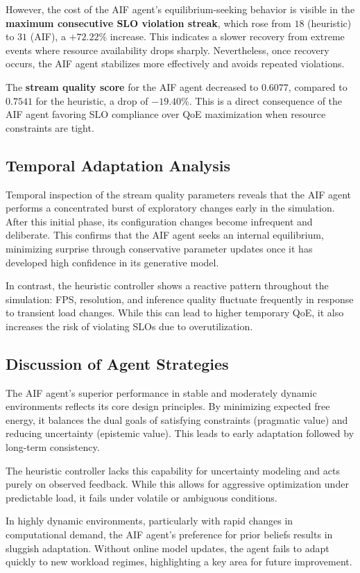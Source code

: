 However, the cost of the AIF agent’s equilibrium-seeking behavior is visible in the \textbf{maximum consecutive SLO violation streak}, which rose from \(18\) (heuristic) to \(31\) (AIF), a \(+72.22\%\) increase. This indicates a slower recovery from extreme events where resource availability drops sharply. Nevertheless, once recovery occurs, the AIF agent stabilizes more effectively and avoids repeated violations.

The \textbf{stream quality score} for the AIF agent decreased to \(0.6077\), compared to \(0.7541\) for the heuristic, a drop of \(-19.40\%\). This is a direct consequence of the AIF agent favoring SLO compliance over QoE maximization when resource constraints are tight.

\subsection{Temporal Adaptation Analysis}

Temporal inspection of the stream quality parameters reveals that the AIF agent performs a concentrated burst of exploratory changes early in the simulation. After this initial phase, its configuration changes become infrequent and deliberate. This confirms that the AIF agent seeks an internal equilibrium, minimizing surprise through conservative parameter updates once it has developed high confidence in its generative model.

In contrast, the heuristic controller shows a reactive pattern throughout the simulation: FPS, resolution, and inference quality fluctuate frequently in response to transient load changes. While this can lead to higher temporary QoE, it also increases the risk of violating SLOs due to overutilization.

\subsection{Discussion of Agent Strategies}

The AIF agent’s superior performance in stable and moderately dynamic environments reflects its core design principles. By minimizing expected free energy, it balances the dual goals of satisfying constraints (pragmatic value) and reducing uncertainty (epistemic value). This leads to early adaptation followed by long-term consistency.

The heuristic controller lacks this capability for uncertainty modeling and acts purely on observed feedback. While this allows for aggressive optimization under predictable load, it fails under volatile or ambiguous conditions.

In highly dynamic environments, particularly with rapid changes in computational demand, the AIF agent’s preference for prior beliefs results in sluggish adaptation. Without online model updates, the agent fails to adapt quickly to new workload regimes, highlighting a key area for future improvement.
